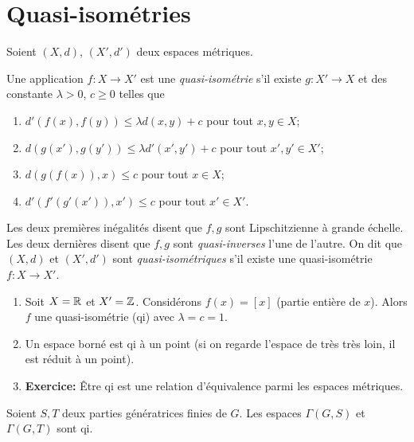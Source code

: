  \section{Quasi-isométries}
  \label{sec:quasi-isometries}

  
  Soient $(X, d)$, $(X', d')$ deux espaces métriques.

  \begin{defi}
    Une application $f: X \to X'$ est une \emph{quasi-isométrie}  s'il existe $g: X' \to
    X$ et des constante $\lambda >0$, $c \geq 0$ telles que
    \begin{enumerate}
    \item $d'(f(x), f(y)) \leq \lambda d(x,y) + c$ pour tout $x, y \in X$;
    \item $d(g(x'), g(y')) \leq \lambda d'(x', y') + c$ pour tout $x', y' \in X'$;
    \item $d(g(f(x)), x) \leq c$ pour tout $x \in X$;
    \item $d'(f'(g'(x')), x') \leq c$ pour tout $x' \in X'$.
    \end{enumerate}
    Les deux premières inégalités disent que $f, g$ sont Lipschitzienne à grande échelle. Les deux dernières
    disent que $f, g$ sont \emph{quasi-inverses}  l'une de l'autre.
    On dit que $(X, d)$ et $(X', d')$ sont \emph{quasi-isométriques}  s'il
    existe une quasi-isométrie $f: X \to X'$.
  \end{defi}


  \begin{exs}
    \begin{enumerate}
    \item Soit $X = \mathbb{R}$ et $X' = \mathbb{Z}$. Considérons $f(x) = [x]$ (partie entière de $x$). Alors $f$ une
      quasi-isométrie (qi) avec $\lambda = c = 1$.

    \item Un espace borné est qi à un point (si on regarde l'espace de très très loin, il est réduit à un
      point).
    \item \textbf{Exercice:} Être qi est une relation d'équivalence parmi les espaces métriques.
    \end{enumerate}
  \end{exs}


  \begin{prop}
    Soient $S, T$ deux parties génératrices finies de $G$. Les espaces $\Gamma(G, S)$ et $\Gamma(G, T)$ sont qi.
  \end{prop}

